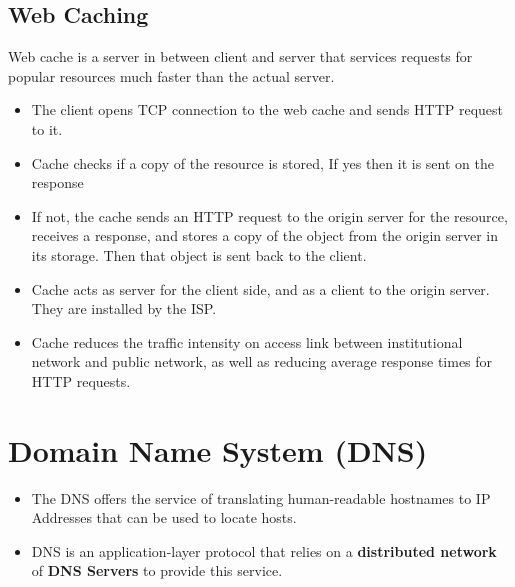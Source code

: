 \documentclass{article}
\theoremstyle{plain}
\theoremstyle{definition}
\begin{document}
\subsection{Web Caching}
Web cache is a server in between client and server that services requests for popular resources much faster than the actual server. 
\begin{itemize}
    \item The client opens TCP connection to the web cache and sends HTTP request to it.
    
    \item Cache checks if a copy of the resource is stored, If yes then it is sent on the response
    
    \item If not, the cache sends an HTTP request to the origin server for the resource, receives a response, and stores a copy of the object from the origin server in its storage. Then that object is sent back to the client.
    
    \item Cache acts as server for the client side, and as a client to the origin server. They are installed by the ISP.
    
    \item Cache reduces the traffic intensity on access link between institutional network and public network, as well as reducing average response times for HTTP requests. 
\end{itemize}

\section{Domain Name System (DNS)}
\begin{itemize}
    \item The DNS offers the service of translating human-readable hostnames to IP Addresses that can be used to locate hosts.
    
    \item DNS is an application-layer protocol that relies on a \textbf{distributed network} of \textbf{DNS Servers} to provide this service. 
\end{itemize}
\end{document}
